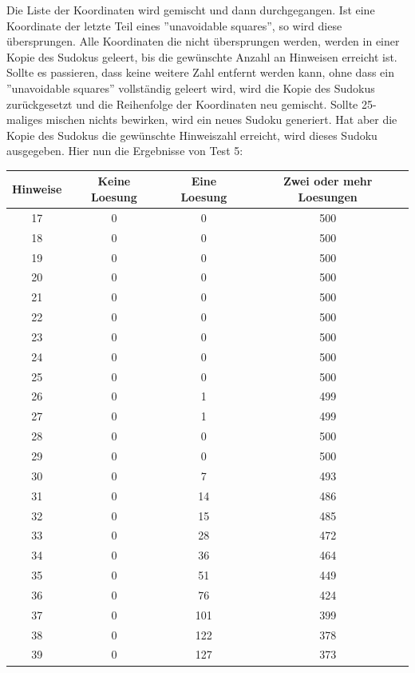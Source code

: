 \documentclass[11pt,a4paper]{article}
\begin{document}
Die Liste der Koordinaten wird gemischt und dann durchgegangen. Ist eine Koordinate der letzte Teil eines ''unavoidable squares'', so wird diese übersprungen. Alle Koordinaten die nicht übersprungen werden, werden in einer Kopie des Sudokus geleert, bis die gewünschte Anzahl an Hinweisen erreicht ist. Sollte es passieren, dass keine weitere Zahl entfernt werden kann, ohne dass ein ''unavoidable squares'' vollständig geleert wird, wird die Kopie des Sudokus zurückgesetzt und die Reihenfolge der Koordinaten neu gemischt. Sollte 25-maliges mischen nichts bewirken, wird ein neues Sudoku generiert. Hat aber die Kopie des Sudokus die gewünschte Hinweiszahl erreicht, wird dieses Sudoku ausgegeben. Hier nun die Ergebnisse von Test 5:
\newpage
\begin{table}[htbp!]
\scriptsize
\begin{center}
\begin{tabular}{|*{4}{c|}}
\hline 
Hinweise & Keine Loesung & Eine Loesung & Zwei oder mehr Loesungen\\ \hline 
17 & 0 & 0 & 500 \\ \hline 
 18 & 0 & 0 & 500 \\ \hline 
 19 & 0 & 0 & 500 \\ \hline 
 20 & 0 & 0 & 500 \\ \hline 
 21 & 0 & 0 & 500 \\ \hline 
 22 & 0 & 0 & 500 \\ \hline 
 23 & 0 & 0 & 500 \\ \hline 
 24 & 0 & 0 & 500 \\ \hline 
 25 & 0 & 0 & 500 \\ \hline 
 26 & 0 & 1 & 499 \\ \hline 
 27 & 0 & 1 & 499 \\ \hline 
 28 & 0 & 0 & 500 \\ \hline 
 29 & 0 & 0 & 500 \\ \hline 
 30 & 0 & 7 & 493 \\ \hline 
 31 & 0 & 14 & 486 \\ \hline 
 32 & 0 & 15 & 485 \\ \hline 
 33 & 0 & 28 & 472 \\ \hline 
 34 & 0 & 36 & 464 \\ \hline 
 35 & 0 & 51 & 449 \\ \hline 
 36 & 0 & 76 & 424 \\ \hline 
 37 & 0 & 101 & 399 \\ \hline 
 38 & 0 & 122 & 378 \\ \hline 
 39 & 0 & 127 & 373 \\ \hline 

\end{tabular}
\end{center}
\end{table}
\end{document}
